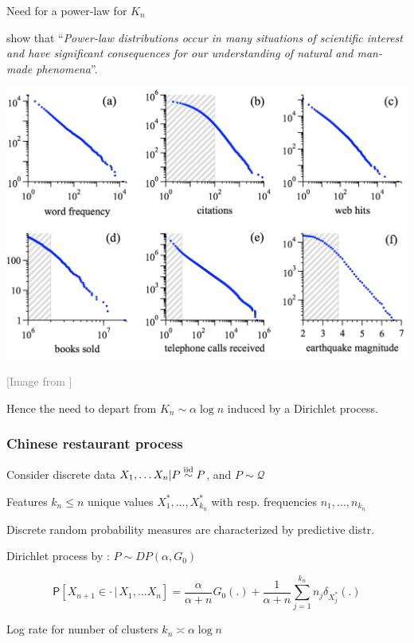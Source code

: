  
 {Need for a power-law for $K_n$}
 
 	\citet{newman2005power,clauset2009power} show that ``\textit{Power-law distributions occur in many situations of scientific interest and have
significant consequences for our understanding of natural and man-made phenomena}''.
		\begin{center}
			\includegraphics[width=.7\textwidth]{figures_julyan/beyond_DP/power_laws_newman}
		\end{center}
		\hfill\textcolor{gray}{[Image from \citet{newman2005power}]}

		Hence the need to depart from $K_n\sim \alpha \log n$ induced by a Dirichlet process.
 

 
\subsubsection{Chinese restaurant process}

Consider discrete data $X_1,\ldots X_n\vert P\stackrel{\mbox{\scriptsize{iid}}}{\sim} P$, and $ P \sim \mathcal{Q}$

Features $k_n\leq n$ unique values $X_1^*,\ldots,X_{k_n}^*$ with resp. frequencies $n_1,\ldots,n_{k_n}$\medskip 


{Discrete random probability measures} are characterized by  \alert{predictive distr.}
\medskip

\alert{Dirichlet process} by \citet{ferguson1973bayesian}: $P\sim DP(\alpha, G_0)$

$$\mathsf{P}[X_{n+1}\in \cdot\, \vert\, X_1,\ldots X_{n}]=\frac{\alpha}{\alpha+n}G_{0}(.)+\frac{1}{\alpha+n}\sum_{j=1}^{{k_n}}n_j\delta_{X_{j}^*}(.)$$

\begin{center}
Log rate for number of clusters \alert{$k_n \asymp \alpha \log n$}
\end{center}

\medskip


